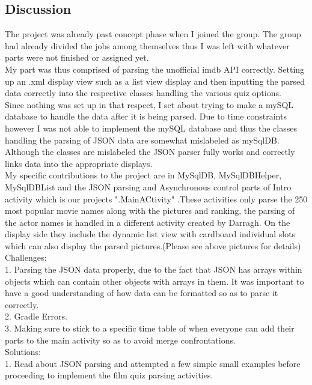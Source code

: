 \documentclass{article}
\begin{document}
\begin{flushleft}
\section{Discussion}
The project was already past concept phase when I joined the group. The group had already divided the jobs among themselves thus I was left with whatever parts were not finished or assigned yet.\\
My part was thus comprised of parsing the unofficial imdb API correctly. Setting up an .xml display view such as  a list view display and then inputting the parsed data correctly into the respective classes handling the various quiz options.\\
Since nothing was set up in that respect, I set about trying to make a mySQL database to handle the data after it is being parsed. Due to time constraints however I was not able to implement the mySQL database and thus the classes handling the parsing of JSON data are somewhat mislabeled as mySqlDB.\\
Although the classes are mislabeled the JSON parser fully works and correctly links data into the appropriate displays.\\ 
My specific contributions to the project are in MySqlDB, MySqlDBHelper, MySqlDBList and the JSON parsing and Asynchronous control parts of Intro activity which is our projects ".MainACtivity" .These activities only parse the 250 most popular movie names along with the pictures and ranking, the parsing of the actor names is handled in a different activity created by Darragh. On the display side they include the dynamic list view with cardboard individual slots which can also display the parsed pictures.(Please see above pictures for details)\\
Challenges:\\
1. Parsing the JSON data properly, due to the fact that JSON has arrays within objects which can contain other objects with arrays in them. It was important to have a good understanding of how data can be formatted so as to parse it correctly.\\
2. Gradle Errors.\\
3. Making sure to stick to a specific time table of when everyone can add their parts to the main activity so as to avoid merge confrontations.\\
Solutions:\\
1. Read about JSON parsing and attempted a few simple small examples before proceeding to implement the film quiz parsing activities.

\end{flushleft}
\end{document}
